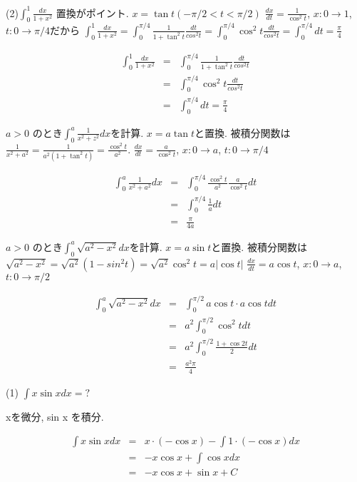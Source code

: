 (2)$
\int_{0}^{1} \frac{dx}{1+x^2}
$
置換がポイント.  $x=\tan t (-\pi/2 < t < \pi/2)$
$\frac{dx}{dt}=\frac{1}{\cos^2 t}$,  $x: 0\rightarrow 1$,  $t: 0\rightarrow \pi/4$だから
$
\int_{0}^{1}\frac{dx}{1+x^2}=\int_{0}^{\pi/4}\frac{1}{1+\tan^2 t}\frac{dt}{cos^2 t}
=\int_{0}^{\pi/4} \cos^2 t \frac{dt}{cos^2 t}
=\int_{0}^{\pi/4} dt = \frac{\pi}{4}
$

\begin{eqnarray*}
 \int_{0}^{1}\frac{dx}{1+x^2} &=&\int_{0}^{\pi/4}\frac{1}{1+\tan^2 t}\frac{dt}{cos^2 t}\\
&=&\int_{0}^{\pi/4} \cos^2 t \frac{dt}{cos^2 t}\\
&=&\int_{0}^{\pi/4} dt = \frac{\pi}{4}
\end{eqnarray*}


$a>0$ のとき$\int_{0}^{a} \frac{1}{x^2+z^2}dx$を計算.  
$x=a\tan t$と置換. 被積分関数は $\frac{1}{x^2+a^2}=\frac{1}{a^2(1+\tan^2 t)}=\frac{\cos^2 t}{a^2}$. 
$\frac{dx}{dt}=\frac{a}{\cos^2 t}$, $x:0\rightarrow a$, $t:0\rightarrow \pi/4$

\begin{eqnarray*}
\int_{0}^{a}\frac{1}{x^2+a^2}dx&=&\int_{0}^{\pi/4} \frac{\cos^2 t}{a^2}\frac{a}{\cos^2 t}dt \\
&=& \int_{0}^{\pi/4}\frac{1}{a}dt\\
&=&\frac{\pi}{4a}
\end{eqnarray*}

$a>0$ のとき$\int_{0}^{a} \sqrt{a^2-x^2}dx$を計算.  
$x=a\sin t$と置換. 被積分関数は $\sqrt{a^2-x^2}=\sqrt{a^2}(1-sin^2 t)=\sqrt{a^2}\cos^2 t=a|\cos t|$
$\frac{dx}{dt}=a\cos t$, 
$x:0\rightarrow a$, $t:0\rightarrow \pi/2$

\begin{eqnarray*}
\int_{0}^{a} \sqrt{a^2-x^2}dx &=& \int_{0}^{\pi/2} a\cos t\cdot a\cos t dt \\
&=& a^2\int_{0}^{\pi/2} \cos^2 t dt\\
&=& a^2\int_{0}^{\pi/2} \frac{1+\cos 2t}{2}dt\\
&=&\frac{a^2\pi}{4}
\end{eqnarray*}

(1) $\int x \sin x dx =?$

xを微分, sin x を積分. 

\begin{eqnarray*}
\int x \sin x dx &=& x\cdot(-\cos x)-\int 1\cdot(-\cos x)dx\\
&=& -x\cos x+\int \cos x dx\\
&=& -x\cos x+\sin x +C
\end{eqnarray*}

